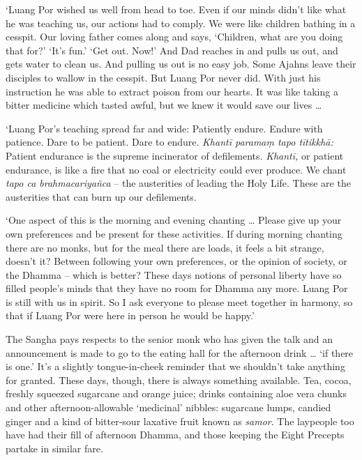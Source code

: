 `Luang Por wished us well from head to toe. Even if our minds didn't
like what he was teaching us, our actions had to comply. We were like
children bathing in a cesspit. Our loving father comes along and says,
`Children, what are you doing that for?' `It's fun.' `Get out. Now!' And
Dad reaches in and pulls us out, and gets water to clean us. And pulling
us out is no easy job. Some Ajahns leave their disciples to wallow in
the cesspit. But Luang Por never did. With just his instruction he was
able to extract poison from our hearts. It was like taking a bitter
medicine which tasted awful, but we knew it would save our lives
\ldots{}

`Luang Por's teaching spread far and wide: Patiently endure. Endure with
patience. Dare to be patient. Dare to endure. \emph{Khantī paramaṃ tapo
tītikkhā:} Patient endurance is the supreme incinerator of defilements.
\emph{Khantī,} or patient endurance, is like a fire that no coal or
electricity could ever produce. We chant \emph{tapo ca brahmacariyañca}
-- the austerities of leading the Holy Life. These are the austerities
that can burn up our defilements.

`One aspect of this is the morning and evening chanting \ldots{}
Please give up your own preferences and be present for these activities. 
If during morning chanting there are no monks, but for the meal there
are loads, it feels a bit strange, doesn't it? Between following your
own preferences, or the opinion of society, or the Dhamma -- which is
better? These days notions of personal liberty have so filled people's
minds that they have no room for Dhamma any more. Luang Por is still
with us in spirit. So I ask everyone to please meet together in harmony, 
so that if Luang Por were here in person he would be happy.'

The Sangha pays respects to the senior monk who has given the talk and
an announcement is made to go to the eating hall for the afternoon drink
\ldots{} `if there is one.' It's a slightly tongue-in-cheek reminder
that we shouldn't take anything for granted. These days, though, there
is always something available. Tea, cocoa, freshly squeezed sugarcane
and orange juice; drinks containing aloe vera chunks and other
afternoon-allowable `medicinal' nibbles: sugarcane lumps, candied ginger
and a kind of bitter-sour laxative fruit known as \emph{samor}. The
laypeople too have had their fill of afternoon Dhamma, and those keeping
the Eight Precepts partake in similar fare. 

